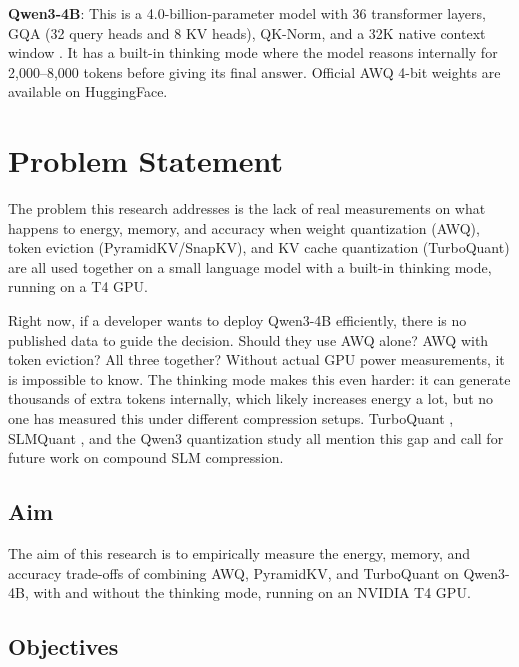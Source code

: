 \documentclass[conference]{IEEEtran}
\begin{document}
\textbf{Qwen3-4B}: This is a 4.0-billion-parameter model with 36 transformer layers, GQA (32 query heads and 8 KV heads), QK-Norm, and a 32K native context window \cite{qwen3}. It has a built-in thinking mode where the model reasons internally for 2,000--8,000 tokens before giving its final answer. Official AWQ 4-bit weights are available on HuggingFace.


\section{Problem Statement}

\sloppy
The problem this research addresses is the lack of real measurements on what happens to energy, memory, and accuracy when weight quantization (AWQ), token eviction (PyramidKV/SnapKV), and KV cache quantization (TurboQuant) are all used together on a small language model with a built-in thinking mode, running on a T4 GPU.
\fussy

Right now, if a developer wants to deploy Qwen3-4B efficiently, there is no published data to guide the decision. Should they use AWQ alone? AWQ with token eviction? All three together? Without actual GPU power measurements, it is impossible to know. The thinking mode makes this even harder: it can generate thousands of extra tokens internally, which likely increases energy a lot, but no one has measured this under different compression setups. TurboQuant \cite{turboquant}, SLMQuant \cite{slmquant}, and the Qwen3 quantization study \cite{qwen3quant2025} all mention this gap and call for future work on compound SLM compression.

\subsection{Aim}

The aim of this research is to empirically measure the energy, memory, and accuracy trade-offs of combining AWQ, PyramidKV, and TurboQuant on \mbox{Qwen3-4B}, with and without the thinking mode, running on an NVIDIA T4 GPU.

\subsection{Objectives}
\end{document}

